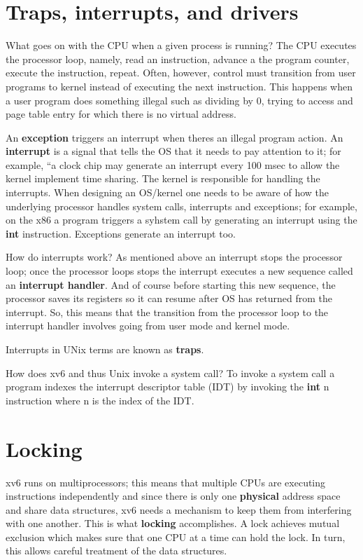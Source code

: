 \documentclass{amsbook}
\begin{document}
\section{Traps, interrupts, and drivers}

What goes on with the CPU when a given process is running? The CPU executes the processor loop, namely, read an instruction, advance a the program counter, execute the instruction, repeat. Often, however, control must transition from user programs to kernel instead of executing the next instruction. This happens when a user program does something illegal such as dividing by 0, trying to access and page table entry for which there is no virtual address.

An \textbf{exception} triggers an interrupt when theres an illegal program action. An \textbf{interrupt} is a signal that tells the OS that it needs to pay attention to it; for example, ``a clock chip may generate an interrupt every 100 msec to allow the kernel implement time sharing. The kernel is responsible for handling the interrupts. When designing an OS/kernel one needs to be aware of how the underlying processor handles system calls, interrupts and exceptions; for example, on the x86 a program triggers a syhstem call by generating an interrupt using the \textbf{int} instruction. Exceptions generate an interrupt too.

How do interrupts work? As mentioned above an interrupt stops the processor loop; once the processor loops stops the interrupt executes a new sequence called an \textbf{interrupt handler}. And of course before starting this new sequence, the processor saves its registers so it can resume after OS has returned from the interrupt. So, this means that the transition from the processor loop to the interrupt handler involves going from user mode and kernel mode.

Interrupts in UNix terms are known as \textbf{traps}.

How does xv6 and thus Unix invoke a system call? To invoke a system call a program indexes the interrupt descriptor table (IDT) by invoking the \textbf{int} n instruction where n is the index of the IDT.

\section{Locking}

xv6 runs on multiprocessors; this means that multiple CPUs are executing instructions independently and since there is only one \textbf{physical} address space and share data structures, xv6 needs a mechanism to keep them from interfering with one another. This is what \textbf{locking} accomplishes. A lock achieves mutual exclusion which makes sure that one CPU at a time can hold the lock. In turn, this allows careful treatment of the data structures.
\end{document}
